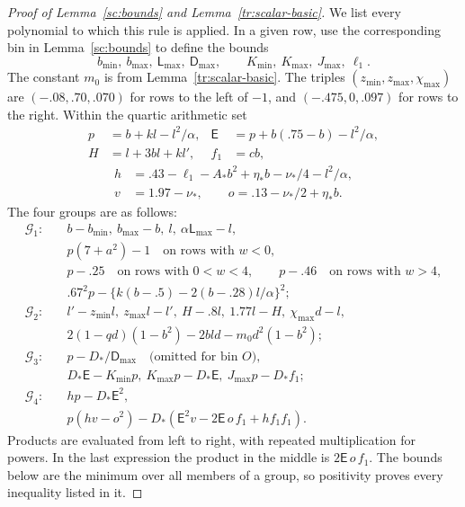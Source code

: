 \documentclass[11pt]{article}
\theoremstyle{definition}
\theoremstyle{remark}
\numberwithin{equation}{section}
\begin{document}
\begin{proof}[Proof of Lemma~\ref{sc:bounds} and Lemma~\ref{tr:scalar-basic}]
We list every polynomial to which this rule is applied. In a given row,
use the corresponding bin in Lemma~\ref{sc:bounds} to define the bounds
\[
 b_{\min},\ b_{\max},\ \mathsf L_{\max},\ \mathsf D_{\max},\qquad
 K_{\min},\ K_{\max},\ J_{\max},\ \ell_1.
\]
The constant $m_0$ is from Lemma~\ref{tr:scalar-basic}.
The triples $(z_{\min},z_{\max},\chi_{\max})$ are
$(-.08,.70,.070)$ for rows to the left of $-1$, and
$(-.475,0,.097)$ for rows to the right. Within the quartic arithmetic set
\[
 \begin{aligned}
 p&=b+kl-l^2/\alpha,&
 \mathsf E&=p+b(.75-b)-l^2/\alpha,\\
 H&=l+3bl+kl',& f_1&=cb,
 \end{aligned}
\]
\[
 \begin{aligned}
 h&=.43-\ell_1-A_*b^2+\eta_*b-\nu_*/4-l^2/\alpha,\\
 v&=1.97-\nu_*,\qquad o=.13-\nu_*/2+\eta_*b.
 \end{aligned}
\]
The four groups are as follows:
\begin{align*}
 \mathcal G_1:\quad& b-b_{\min},\ b_{\max}-b,\ l,\
       \alpha\mathsf L_{\max}-l,\\
 &p(7+a^2)-1\quad\text{on rows with }w<0,\\
 &p-.25\quad\text{on rows with }0<w<4,\qquad
   p-.46\quad\text{on rows with }w>4,\\
 &.67^2p-\{k(b-.5)-2(b-.28)l/\alpha\}^2;\\[1mm]
 \mathcal G_2:\quad& l'-z_{\min}l,\ z_{\max}l-l',\
       H-.8l,\ 1.77l-H,\ \chi_{\max}d-l,\\
 &2(1-qd)(1-b^2)-2bld-m_0d^2(1-b^2);\\[1mm]
 \mathcal G_3:\quad& p-D_*/\mathsf D_{\max}\quad
                         \text{(omitted for bin }O\text{)},\\
 &D_*\mathsf E-K_{\min}p,\ K_{\max}p-D_*\mathsf E,\
       J_{\max}p-D_*f_1;\\[1mm]
 \mathcal G_4:\quad& hp-D_*\mathsf E^2,\\
 &p(hv-o^2)-D_*(\mathsf E^2v-2\mathsf E\,o\,f_1+h f_1 f_1).
\end{align*}
Products are evaluated from left to right, with repeated multiplication
for powers. In the last expression the product in the middle is
$2\mathsf E\,o\,f_1$. The bounds below are the minimum over all members
of a group, so positivity proves every inequality listed in it.

\begin{table}[htbp]


\end{table}
\end{proof}
\end{document}
